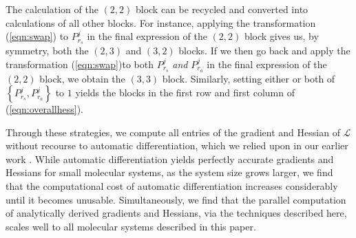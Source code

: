 \documentclass[10pt]{article}
\begin{document}
The calculation of the $(2,2)$ block can be recycled and converted into calculations of all other blocks.  For instance, applying the transformation (\ref{eqn:swap}) to $P_{r_s}^j$ in the final expression of the $(2,2)$ block gives us, by symmetry, both the $(2,3)$ and $(3,2)$ blocks.  If we then go back and apply the transformation (\ref{eqn:swap})to both $P_{r_s}^j$ \emph{and} $P_{r_a}^j$ in the final expression of the $(2,2)$ block, we obtain the $(3,3)$ block.  Similarly, setting either or both of $\left\{ P_{r_s}^j, P_{r_a}^j \right\}$ to $1$ yields the blocks in the first row and first column of (\ref{eqn:overallhess}).

Through these strategies, we compute all entries of the gradient and Hessian of $\mathcal{L}$ without recourse to automatic differentiation, which we relied upon in our earlier work \cite{bhat2020machine}.  While automatic differentiation yields perfectly accurate gradients and Hessians for small molecular systems, as the system size grows larger, we find that the computational cost of automatic differentiation increases considerably until it becomes unusable.  Simultaneously, we find that the  parallel computation of analytically derived gradients and Hessians, via the techniques described here, scales well to all molecular systems described in this paper.


%



\end{document}
